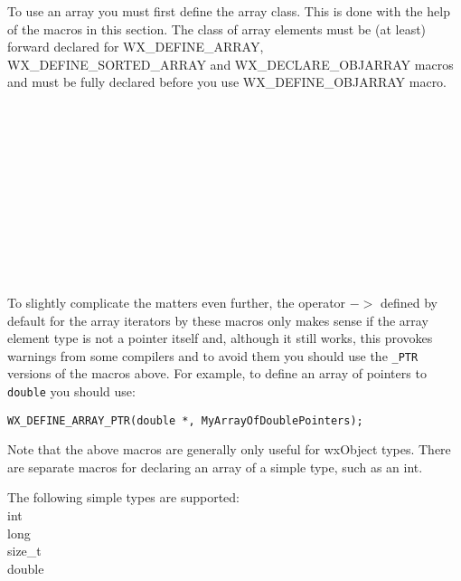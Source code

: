 
\label{arraymacros}

To use an array you must first define the array class. This is done with the
help of the macros in this section. The class of array elements must be (at
least) forward declared for WX\_DEFINE\_ARRAY, WX\_DEFINE\_SORTED\_ARRAY and
WX\_DECLARE\_OBJARRAY macros and must be fully declared before you use
WX\_DEFINE\_OBJARRAY macro.

\\
\\
\\
\\
\\
\\
\\
\\
\\
\\

To slightly complicate the matters even further, the operator $->$ defined by
default for the array iterators by these macros only makes sense if the array
element type is not a pointer itself and, although it still works, this
provokes warnings from some compilers and to avoid them you should use the
{\tt \_PTR} versions of the macros above. For example, to define an array of
pointers to {\tt double} you should use:

\begin{verbatim}
WX_DEFINE_ARRAY_PTR(double *, MyArrayOfDoublePointers);
\end{verbatim}

Note that the above macros are generally only useful for
wxObject types.  There are separate macros for declaring an array of a simple type,
such as an int.

The following simple types are supported:\\
int\\
long\\
size\_t\\
double

